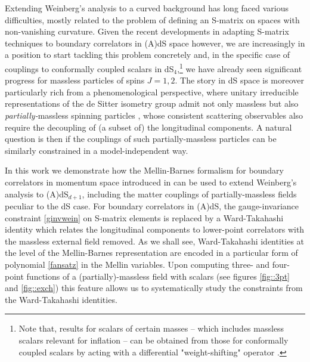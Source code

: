 \documentclass[11pt,a4paper]{article}
\begin{document}
Extending Weinberg's analysis to a curved background has long faced various difficulties, mostly related to the problem of defining an S-matrix on spaces with non-vanishing curvature. Given the recent developments in adapting S-matrix techniques to boundary correlators in (A)dS space however, we are increasingly in a position to start tackling this problem concretely and, in the specific case of couplings to conformally coupled scalars in dS$_4$,\footnote{Note that, results for scalars of certain masses -- which includes massless scalars relevant for inflation -- can be obtained from those for conformally coupled scalars by acting with a differential "weight-shifting" operator \cite{Arkani-Hamed:2015bza,Arkani-Hamed:2018kmz,Baumann:2020dch}.} we have already seen significant progress \cite{Baumann:2020dch} for massless particles of spins $J=1,2$. The story in dS space is moreover particularly rich from a phenomenological perspective, where unitary irreducible representations of the de Sitter isometry group admit not only massless but also \emph{partially-}massless spinning particles \cite{Deser:1983mm,Higuchi:1986py,Deser:2001pe,Deser:2001us,Deser:2001us,Dolan:2001ih,Deser:2003gw}, whose consistent scattering observables also require the decoupling of (a subset of) the longitudinal components. A natural question is then if the couplings of such partially-massless particles can be similarly constrained in a model-independent way.

In this work we demonstrate how the Mellin-Barnes formalism for boundary correlators in momentum space introduced in \cite{Sleight:2019mgd,Sleight:2019hfp} can be used to extend Weinberg's analysis to (A)dS$_{d+1}$, including the matter couplings of partially-massless fields peculiar to the dS case. For boundary correlators in (A)dS, the gauge-invariance constraint \eqref{ginvwein} on S-matrix elements is replaced by a Ward-Takahashi identity which relates the longitudinal components to lower-point correlators with the massless external field removed. As we shall see, Ward-Takahashi identities at the level of the Mellin-Barnes representation are encoded in a particular form of polynomial \eqref{fansatz} in the Mellin variables. Upon computing three- and four-point functions of a (partially)-massless field with scalars (see figures \ref{fig::3pt} and \ref{fig::exch}) this feature allows us to systematically study the constraints from the Ward-Takahashi identities. 
\end{document}
